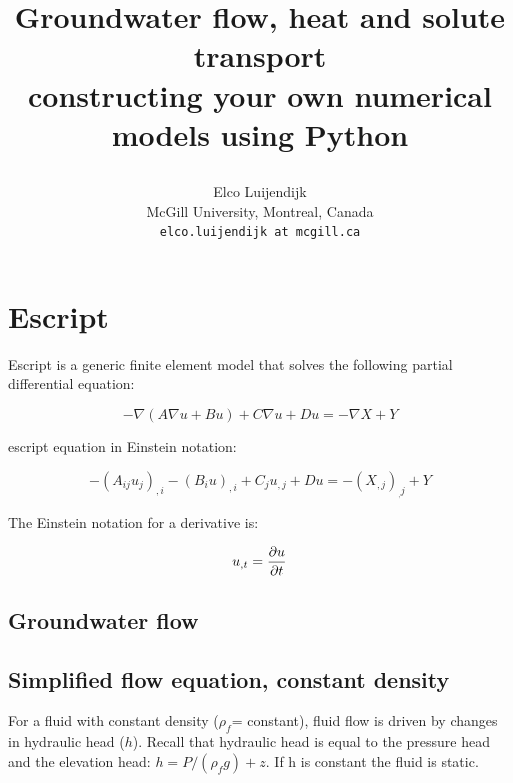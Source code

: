 \documentclass[11pt]{article}
\begin{document}
\title{\Large Groundwater flow, heat and solute transport\\
constructing your own numerical models using Python
\author{
\large Elco Luijendijk\\
\normalsize McGill University, Montreal, Canada\\
\texttt{elco.luijendijk at mcgill.ca}\\
}
\date{}
}

\maketitle


\section{Escript}

Escript is a generic finite element model that solves the following partial differential equation:

\begin{equation}
    - \nabla (A \nabla u + B u ) + C \nabla u + D u = - \nabla X + Y
\end{equation}


escript equation in Einstein notation:

\begin{equation}
    - (A_{ij} u_{j} ) _{,i} - (B_{i} u) _{,i} + C_{j} u_{,j} + D u = -(X_{,j})_{_,j} + Y 
\end{equation}

The Einstein notation for a derivative is:

\begin{equation}
    u_{,t} = {\partial u \over{\partial{t} } }
\end{equation}


\pagebreak

\subsection{Groundwater flow}


\subsection{Simplified flow equation, constant density}

For a fluid with constant density ($\rho_f$= constant), fluid flow is driven by changes in hydraulic head ($h$). Recall that hydraulic head is equal to the pressure head and the elevation head: $h = P/ (\rho_f g) + z$. If h is constant the fluid is static.
\end{document}
